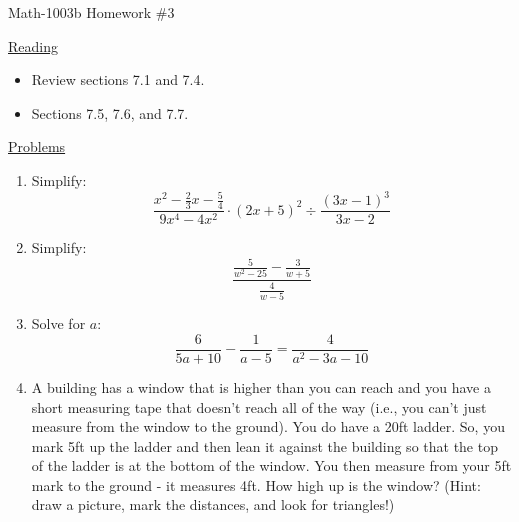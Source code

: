 \documentclass[letterpaper,12pt,fleqn]{article}
\begin{document}
\begin{center}
\Large Math-1003b Homework \#3
\end{center}

\vspace{0.5in}

\underline{Reading}

\bigskip

\begin{itemize}
\item Review sections 7.1 and 7.4.
\item Sections 7.5, 7.6, and 7.7.
\end{itemize}

\bigskip

\underline{Problems}

\bigskip

\begin{enumerate}
\item Simplify:
  \[\frac{x^2-\frac{2}{3}x-\frac{5}{4}}{9x^4-4x^2}\cdot(2x+5)^2\div
  \frac{(3x-1)^3}{3x-2}\]

\item Simplify:
  \[\frac{\frac{5}{w^2-25}-\frac{3}{w+5}}{\frac{4}{w-5}}\]

\item Solve for $a$:
  \[\frac{6}{5a+10}-\frac{1}{a-5}=\frac{4}{a^2-3a-10}\]

\item A building has a window that is higher than you can reach and you have a
  short measuring tape that doesn't reach all of the way (i.e., you can't just
  measure from the window to the ground). You do have a 20ft ladder. So, you
  mark 5ft up the ladder and then lean it against the building so that the top
  of the ladder is at the bottom of the window. You then measure from your 5ft
  mark to the ground - it measures 4ft. How high up is the window? (Hint: draw
  a picture, mark the distances, and look for triangles!)
\end{enumerate}
\end{document}
